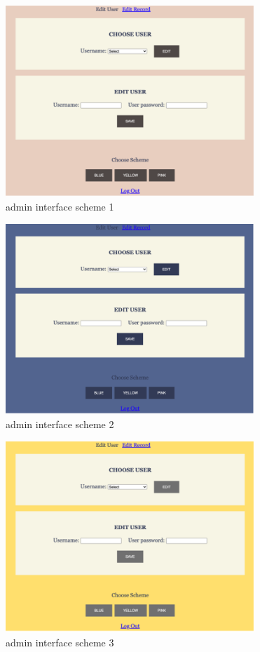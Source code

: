 \documentclass[12pt, letterpaper]{article}
\begin{document}
 \begin{figure}[htbp]
	\centering
	\includegraphics[width=3.7in]{images/q14-4.png}
	\caption{admin interface scheme 1}
 \end{figure}
 
 \begin{figure}[htbp]
	\centering
	\includegraphics[width=3.7in]{images/q14-5.png}
	\caption{admin interface scheme 2}
 \end{figure}
 
 \newpage

\begin{figure}[htbp]
	\centering
	\includegraphics[width=3.7in]{images/q14-6.png}
	\caption{admin interface scheme 3}
 \end{figure}
 \newpage
\end{document}

